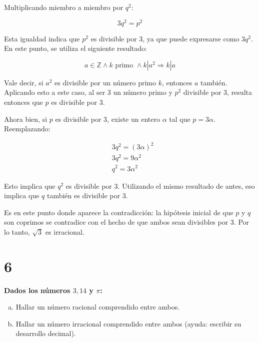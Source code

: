 \documentclass{article}
\newcommand{\sectionx}[1]{\section*{#1}\label{sec:#1}\addcontentsline{toc}{section}{\nameref{sec:#1}}}
\begin{document}
Multiplicando miembro a miembro por $ q^2 $:

\begin{equation}
3 q^2 = p^2
\end{equation}

Esta igualdad indica que $ p^2 $ es divisible por 3, ya que puede expresarse como $ 3 q^2 $. En este punto, se utiliza el siguiente resultado:

\begin{equation}
a \in \mathbb{Z} \wedge k \text{ primo } \wedge k | a^2 \Rightarrow k | a
\end{equation}

Vale decir, si $ a^2 $ es divisible por un número primo $ k $, entonces $ a $ también. Aplicando esto a este caso, al ser 3 un número primo y $ p^2 $ divisible por 3, resulta entonces que $ p $ es divisible por 3.

Ahora bien, si $ p $ es divisible por 3, existe un entero $ \alpha $ tal que $ p = 3 \alpha $. Reemplazando:

\begin{subequations}
\begin{align}
& 3 q^2 = (3 \alpha)^2 \\
& 3 q^2 = 9 \alpha^2 \\
& q^2 = 3 \alpha^2
\end{align}
\end{subequations}

Esto implica que $ q^2 $ es divisible por 3. Utilizando el mismo resultado de antes, eso implica que $ q $ también es divisible por 3.

Es en este punto donde aparece la contradicción: la hipótesis inicial de que $ p $ y $ q $ son coprimos se contradice con el hecho de que ambos sean divisibles por 3. Por lo tanto, $ \sqrt{3} $ es irracional.

\sectionx{6}

\textbf{ Dados los números $ 3,14 $ y $ \pi $: }

\begin{enumerate}[(a)]

\bfseries

\item Hallar un número racional comprendido entre ambos.

\item Hallar un número irracional comprendido entre ambos (ayuda: escribir su desarrollo decimal).

\end{enumerate}
\end{document}
